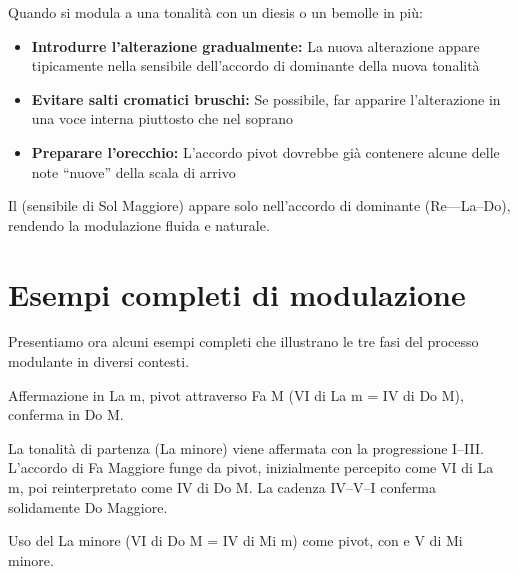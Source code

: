 \begin{regola}
	\label{reg:introduzione_alterazioni}
	Quando si modula a una tonalità con un diesis o un bemolle in più:
	
	\begin{itemize}
		\item \textbf{Introdurre l'alterazione gradualmente:} La nuova alterazione appare tipicamente nella sensibile dell'accordo di dominante della nuova tonalità
		\item \textbf{Evitare salti cromatici bruschi:} Se possibile, far apparire l'alterazione in una voce interna piuttosto che nel soprano
		\item \textbf{Preparare l'orecchio:} L'accordo pivot dovrebbe già contenere alcune delle note ``nuove'' della scala di arrivo
	\end{itemize}
\end{regola}

\begin{esempio}
	\label{ex:gestione_fad}

	Il \Fadiesis  (sensibile di Sol Maggiore) appare solo nell'accordo di dominante (Re--\Fadiesis --La--Do), rendendo la modulazione fluida e naturale.
\end{esempio}

\section{Esempi completi di modulazione}
\label{sec:esempi_completi}

Presentiamo ora alcuni esempi completi che illustrano le tre fasi del processo modulante in diversi contesti.

\begin{esempio}
	\label{ex:mod_completa_lam_dom}
	Affermazione in La m, pivot attraverso Fa M (VI di La m = IV di Do M), conferma in Do M.

	La tonalità di partenza (La minore) viene affermata con la progressione I--III. L'accordo di Fa Maggiore funge da pivot, inizialmente percepito come VI di La m, poi reinterpretato come IV di Do M. La cadenza IV--V--I conferma solidamente Do Maggiore.
\end{esempio}

\begin{esempio}
	\label{ex:mod_settima_do_mim}
	Uso del La minore (VI di Do M = IV di Mi m) come pivot, con  e V di Mi minore.

\end{esempio}

